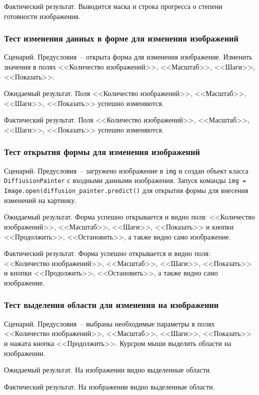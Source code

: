 Фактический результат. Выводится маска и строка прогресса о степени готовности изображения.

\subsubsection{Тест изменения данных в форме для изменения изображений}

Сценарий. Предусловия~-- открыта форма для изменения изображение. Изменить значения в полях <<Количество изображений>>, <<Масштаб>>, <<Шаги>>, <<Показать>>. 

Ожидаемый результат. Поля <<Количество изображений>>, <<Масштаб>>, <<Шаги>>, <<Показать>> успешно изменяются.

Фактический результат. Поля <<Количество изображений>>, <<Масштаб>>, <<Шаги>>, <<Показать>> успешно изменяются.

\subsubsection{Тест открытия формы для изменения изображений}

Сценарий. Предусловия~-- загружено изображение в \lstinline{img} и создан объект класса \lstinline{DiffiusionPainter} с входными данными изображения. Запуск команды \lstinline{img = Image.open(diffusion_painter.predict()} для открытия формы для внесения изменений на картинку. 

Ожидаемый результат. Форма успешно открывается и видно поля: <<Количество изображений>>, <<Масштаб>>, <<Шаги>>, <<Показать>> и кнопки <<Продолжить>>, <<Остановить>>, а также видно само изображение.

Фактический результат. Форма успешно открывается и видно поля: <<Количество изображений>>, <<Масштаб>>, <<Шаги>>, <<Показать>> и кнопки <<Продолжить>>, <<Остановить>>, а также видно само изображение.

\subsubsection{Тест выделения области для изменения на изображении}

Сценарий. Предусловия~-- выбраны необходимые параметры в полях <<Количество изображений>>, <<Масштаб>>, <<Шаги>>, <<Показать>> и нажата кнопка <<Продолжить>>. Курсром мыши выделить области на изображении.

Ожидаемый результат. На изображении видно выделенные области.

Фактический результат. На изображении видно выделенные области.

